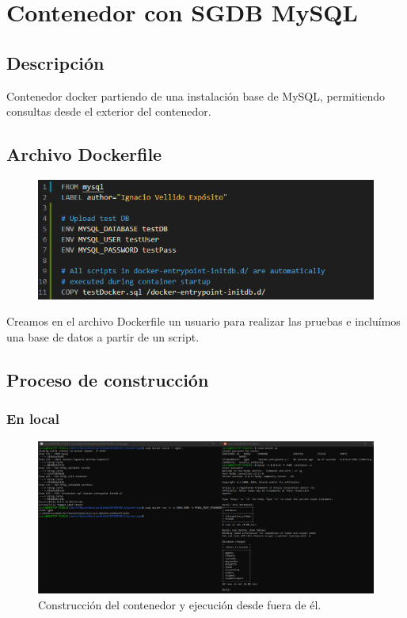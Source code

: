\section{Contenedor con SGDB MySQL}

\subsection{Descripción}

Contenedor docker partiendo de una instalación base de MySQL, permitiendo consultas desde el exterior del contenedor.

\subsection{Archivo Dockerfile}

\begin{figure}[H]\center\includegraphics[width=.95\linewidth]{img/sgbd/s3.png}\caption{}\end{figure}

Creamos en el archivo Dockerfile un usuario para realizar las pruebas e incluímos una base de datos a partir de un script.

\subsection{Proceso de construcción}

\subsubsection{En local}

\begin{figure}[H]\center\includegraphics[width=.99\linewidth]{img/sgbd/s2.png}\caption{Construcción del contenedor y ejecución desde fuera de él.}\end{figure}

